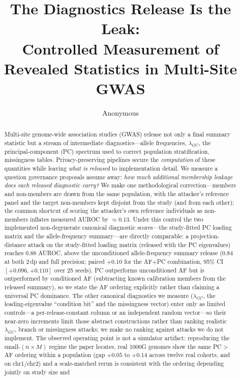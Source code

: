\documentclass[11pt]{article}
\title{\textbf{The Diagnostics Release Is the Leak:}\\
Controlled Measurement of Revealed Statistics in Multi-Site GWAS}
\author{Anonymous}
\date{}
\begin{document}
\maketitle

\begin{abstract}
Multi-site genome-wide association studies (GWAS) release not only a final
summary statistic but a stream of intermediate diagnostics---allele frequencies,
$\lambda_{GC}$, the principal-component (PC) spectrum used to correct population
stratification, missingness tables. Privacy-preserving pipelines secure the
\emph{computation} of these quantities while leaving \emph{what is released} to
implementation detail. We measure a question governance proposals assume away:
\emph{how much additional membership leakage does each released diagnostic
carry?} We make one methodological correction---members and non-members are
drawn from the same population, with the attacker's reference panel and the
target non-members kept disjoint from the study (and from each other); the
common shortcut of scoring the attacker's own reference individuals as
non-members inflates measured AUROC by $\approx 0.13$. Under this control the two implemented
non-degenerate canonical diagnostic scores---the study-fitted PC loading matrix
and the allele-frequency summary---are directly comparable: a
projection-distance attack on the study-fitted loading matrix (released with the
PC eigenvalues) reaches $0.88$
AUROC, above the unconditioned allele-frequency summary release ($0.84$ at both
2\,dp and full precision; paired $+0.10$ for the AF$+$PC combination,
95\% CI $[+0.096,+0.110]$ over 25 seeds). PC outperforms unconditioned AF but is
outperformed by conditioned AF (subtracting known calibration members from the
released summary), so we state the AF ordering explicitly rather than claiming a
universal PC dominance. The other canonical
diagnostics we
measure ($\lambda_{GC}$, the leading-eigenvalue ``condition bit'' and the
missingness vector) enter only as limited controls---a per-release-constant
column or an independent random vector---so their near-zero increments limit
those abstract constructions rather than ranking realistic $\lambda_{GC}$,
branch or missingness attacks; we make no ranking against attacks we do not
implement. The observed operating point is not a simulator
artifact: reproducing the small-$(n{\times}M)$ regime the paper locates, real
1000G genomes show the same PC$>$AF ordering within a population (gap $+0.05$ to
$+0.14$ across twelve real cohorts, and on chr1/chr2) and a scale-matched
rerun is consistent with the ordering depending jointly on study size and

\end{abstract}
\end{document}

